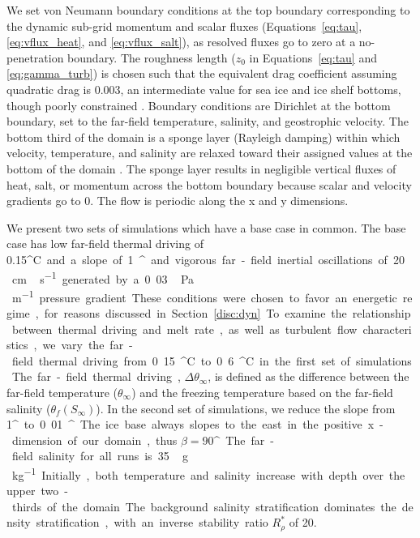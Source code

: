 \documentclass[tc, manuscript]{copernicus}
\begin{document}
We set von Neumann boundary conditions at the top boundary corresponding to the dynamic sub-grid momentum and scalar fluxes (Equations~\ref{eq:tau}, \ref{eq:vflux_heat}, and \ref{eq:vflux_salt}), as resolved fluxes go to zero at a no-penetration boundary. The roughness length ($z_0$ in Equations~\ref{eq:tau} and \ref{eq:gamma_turb}) is chosen such that the equivalent drag coefficient assuming quadratic drag is 0.003, an intermediate value for sea ice and ice shelf bottoms, though poorly constrained \citep{holland_modeling_1999, holland_effects_2006, macayeal_numerical_1984, nicholls_measurements_2006}. Boundary conditions are Dirichlet at the bottom boundary, set to the far-field temperature, salinity, and geostrophic velocity. The bottom third of the domain is a sponge layer (Rayleigh damping) within which velocity, temperature, and salinity are relaxed toward their assigned values at the bottom of the domain \citep{klemp_numerical_1978, maronga_parallelized_2015}. The sponge layer results in negligible vertical fluxes of heat, salt, or momentum across the bottom boundary because scalar and velocity gradients go to 0. The flow is periodic along the x and y dimensions. 

We present two sets of simulations which have a base case in common. The base case has low far-field thermal driving of 0.15\unit{^{\circ}C} and a slope of 1\unit{^{\circ}} and vigorous far-field inertial oscillations of 20\,\unit{cm\,s^{-1}} generated by a 0.03\,\unit{Pa\,m^{-1}} pressure gradient. These conditions were chosen to favor an energetic regime, for reasons discussed in Section~\ref{disc:dyn}. To examine the relationship between thermal driving and melt rate, as well as turbulent flow characteristics, we vary the far-field thermal driving from 0.15\unit{^{\circ}C} to 0.6\unit{^{\circ}C} in the first set of simulations. The far-field thermal driving, $\Delta \theta_\infty$, is defined as the difference between the far-field temperature ($\theta_{\infty}$) and the freezing temperature based on the far-field salinity ($\theta_f(S_{\infty})$). In the second set of simulations, we reduce the slope from 1\unit{^{\circ}} to 0.01\unit{^{\circ}}. The ice base always slopes to the east in the positive x-dimension of our domain, thus $\beta = 90$\unit{^{\circ}}. The far-field salinity for all runs is 35\,\unit{g\,kg^{-1}}. Initially, both temperature and salinity increase with depth over the upper two-thirds of the domain. The background salinity stratification dominates the density stratification, with an inverse stability ratio $R_\rho^*$ of 20. 
\end{document}
